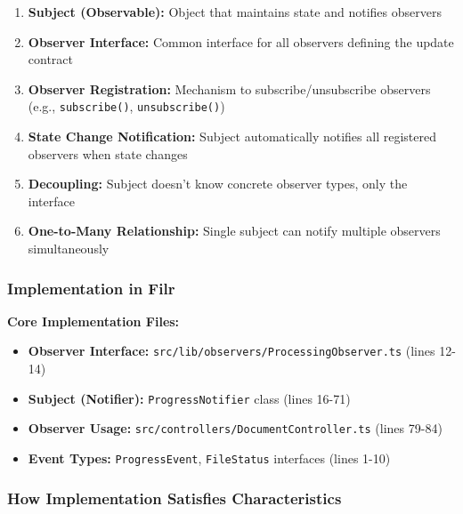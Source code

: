 \documentclass[11pt]{article}
\begin{document}
\begin{enumerate}[noitemsep]
    \item \textbf{Subject (Observable):} Object that maintains state and notifies observers
    \item \textbf{Observer Interface:} Common interface for all observers defining the update contract
    \item \textbf{Observer Registration:} Mechanism to subscribe/unsubscribe observers (e.g., \texttt{subscribe()}, \texttt{unsubscribe()})
    \item \textbf{State Change Notification:} Subject automatically notifies all registered observers when state changes
    \item \textbf{Decoupling:} Subject doesn't know concrete observer types, only the interface
    \item \textbf{One-to-Many Relationship:} Single subject can notify multiple observers simultaneously
\end{enumerate}

\subsubsection{Implementation in Filr}

\textbf{Core Implementation Files:}
\begin{itemize}[noitemsep]
    \item \textbf{Observer Interface:} \texttt{src/lib/observers/ProcessingObserver.ts} (lines 12-14)
    \item \textbf{Subject (Notifier):} \texttt{ProgressNotifier} class (lines 16-71)
    \item \textbf{Observer Usage:} \texttt{src/controllers/DocumentController.ts} (lines 79-84)
    \item \textbf{Event Types:} \texttt{ProgressEvent}, \texttt{FileStatus} interfaces (lines 1-10)
\end{itemize}

\subsubsection{How Implementation Satisfies Characteristics}
\end{document}
